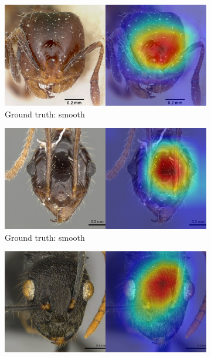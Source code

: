 \documentclass[12pt]{article}
\begin{document}
\newcommand{\subwidth}{0.7\textwidth}
\begin{figure}
    \centering
    \begin{subfigure}{\subwidth}
        \includegraphics[width=1\linewidth]{assets/gradcam/correct_ideal/518.png}
        \caption{Ground truth: smooth}
        \label{fig:correct_ideal_518}
    \end{subfigure}
    \begin{subfigure}{\subwidth}
        \includegraphics[width=1\linewidth]{assets/gradcam/correct_ideal/808.png}
        \caption{Ground truth: smooth}
        \label{fig:correct_ideal_808}
    \end{subfigure}
    \begin{subfigure}{\subwidth}
        \includegraphics[width=1\linewidth]{assets/gradcam/correct_ideal/842.png}

\end{subfigure}
\end{figure}
\end{document}
